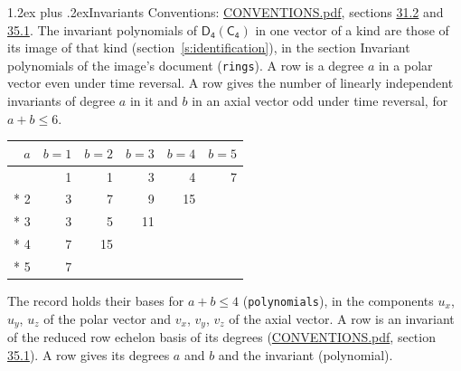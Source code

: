 \documentclass[10pt,a4paper]{article}
\makeatletter
\renewcommand\section{\@startsection{section}{1}{\z@}{-3ex plus -1ex minus -.2ex}%
  {1.2ex plus .2ex}{\normalfont\large\sffamily\bfseries\color{parttitle}}}
\numberwithin{equation}{section}
\newcommand{\grp}[1]{\mathsf{#1}}
\makeatother
\begin{document}
\section{Invariants}\label{s:invariants}
Conventions: \href{../../CONVENTIONS.pdf}{CONVENTIONS.pdf}, sections \href{../../CONVENTIONS.pdf\#conv.31.2}{31.2} and \href{../../CONVENTIONS.pdf\#conv.35.1}{35.1}.
The invariant polynomials of $\grp{D_{4}}(\grp{C_{4}})$ in one vector of a kind are those of its image of that kind (section~\ref{s:identification}), in the section Invariant polynomials of the image's document (\texttt{rings}).
\leavevmode\label{n:index.degree.polar}\label{n:index.degree.axial}A row is a degree $a$ in a polar vector even under time reversal. A row gives the number of linearly independent invariants of degree $a$ in it and $b$ in an axial vector odd under time reversal, for $a + b \le 6$.
{\small\begin{longtable}{@{}rrrrrr@{}}\toprule
$a$ & $b = 1$ & $b = 2$ & $b = 3$ & $b = 4$ & $b = 5$\\\midrule\endhead
\bottomrule\endfoot\endlastfoot
1 & 1 & 1 & 3 & 4 & 7\\*
2 & 3 & 7 & 9 & 15 & \\*
3 & 3 & 5 & 11 &  & \\*
4 & 7 & 15 &  &  & \\*
5 & 7 &  &  &  & \\
\bottomrule\end{longtable}}
\leavevmode\label{n:local.component.polar}\label{n:local.component.axial}The record holds their bases for $a + b \le 4$ (\texttt{polynomials}), in the components $u_{x}$, $u_{y}$, $u_{z}$ of the polar vector and $v_{x}$, $v_{y}$, $v_{z}$ of the axial vector. \label{n:head.polynomial}A row is an invariant of the reduced row echelon basis of its degrees (\href{../../CONVENTIONS.pdf}{CONVENTIONS.pdf}, section \href{../../CONVENTIONS.pdf\#conv.35.1}{35.1}). A row gives its degrees $a$ and $b$ and the invariant (polynomial).
\end{document}
